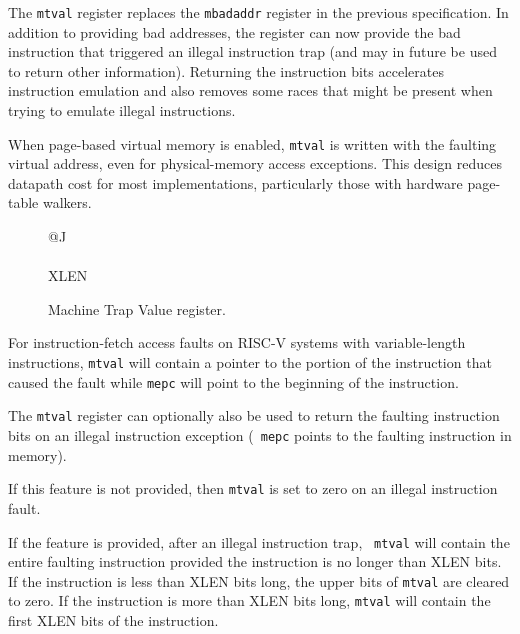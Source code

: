 \begin{commentary}
  The {\tt mtval} register replaces the {\tt mbadaddr} register in
  the previous specification.  In addition to providing bad addresses,
  the register can now provide the bad instruction that triggered an
  illegal instruction trap (and may in future be used to return other
  information).  Returning the instruction bits accelerates instruction emulation and also
  removes some races that might be present when trying to emulate
  illegal instructions.
\end{commentary}
\begin{commentary}
  When page-based virtual memory is enabled, {\tt mtval} is written with
  the faulting virtual address, even for physical-memory access exceptions.
  This design reduces datapath cost for most implementations, particularly
  those with hardware page-table walkers.
\end{commentary}

\begin{figure}[h!]
{\footnotesize
\begin{center}
\begin{tabular}{@{}J}
 \\
\hline
{} \\
\hline
XLEN \\
\end{tabular}
\end{center}
}
\vspace{-0.1in}
\caption{Machine Trap Value register.}
\label{mtvalreg}
\end{figure}

For instruction-fetch access faults on RISC-V systems with
variable-length instructions, {\tt mtval} will contain a pointer to
the portion of the instruction that caused the fault while {\tt mepc}
will point to the beginning of the instruction.

The {\tt mtval} register can optionally also be used to return the
faulting instruction bits on an illegal instruction exception ({\tt
  mepc} points to the faulting instruction in memory).

If this feature is not provided, then {\tt mtval} is set to zero on
an illegal instruction fault.

If the feature is provided, after an illegal instruction trap, {\tt
  mtval} will contain the entire faulting instruction provided the
instruction is no longer than XLEN bits.  If the instruction is less
than XLEN bits long, the upper bits of {\tt mtval} are cleared to
zero. If the instruction is more than XLEN bits long, {\tt mtval}
will contain the first XLEN bits of the instruction.

